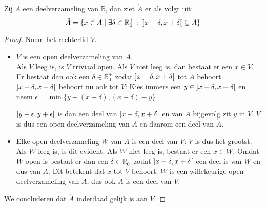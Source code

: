 \documentclass[main.tex]{subfiles}
\begin{document}
\begin{pr}
  Zij $A$ een deelverzameling van $\mathbb{R}$, dan ziet $\mathring{A}$ er als volgt uit:
  \[ \mathring{A} = \{ x\in A\mid \exists \delta \in \mathbb{R}_{0}^{+}:\ \interval[open]{x-\delta}{x+\delta} \subseteq A \} \]

  \begin{proof}
    Noem het rechterlid $V$.
    \begin{itemize}
    \item $V$ is een open deelverzameling van $A$.\\
      Als $V$ leeg is, is $V$ triviaal open.
      Als $V$ niet leeg is, dan bestaat er een $x\in V$.
      Er bestaat dan ook een $\delta \in \mathbb{R}_{0}^{+}$ zodat $\interval[open]{x-\delta}{x+\delta}$ tot $A$ behoort.
      $\interval[open]{x-\delta}{x+\delta}$ behoort nu ook tot $V$:
      Kies immers een $y\in \interval[open]{x-\delta}{x+\delta}$ en neem $\epsilon = \min\{y-(x-\delta),(x+\delta)-y\}$
      \begin{figure}[H]
        \centering
      \end{figure}
      $\interval[open]{y-\epsilon}{y+\epsilon}$ is dan een deel van $\interval[open]{x-\delta}{x+\delta}$ en van $A$ bijgevolg zit $y$ in $V$.
      $V$ is dus een open deelverzameling van $A$ en daarom een deel van $\mathring{A}$.
    \item Elke open deelverzameling $W$ van $A$ is een deel van $V$: $V$ is dus het grootst.\\
      Als $W$ leeg is, is dit evident.
      Als $W$ niet leeg is, bestaat er een $x\in W$.
      Omdat $W$ open is bestaat er dan een $\delta\in \mathbb{R}_{0}^{+}$ zodat $\interval[open]{x-\delta}{x+\delta}$ een deel is van $W$ en dus van $A$.
      Dit betekent dat $x$ tot $V$ behoort.
      $W$ is een willekeurige open deelverzameling van $A$, dus ook $\mathring{A}$ is een deel van $V$.
    \end{itemize}
    We concluderen dat $\mathring{A}$ inderdaad gelijk is aan $V$.
  \end{proof}
\end{pr}
\end{document}
